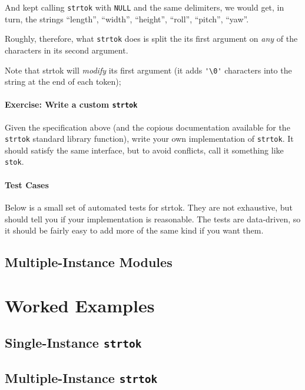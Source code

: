 \documentclass[a4paper,10pt]{article}
\newcommand{\kw}[1]{\texttt{#1}}
\newcommand{\filename}[1]{\texttt{#1}}
\newcommand{\drmcode}[3]{\noindent\begin{minipage}{\columnwidth}\end{minipage}}
\newcommand{\cfile}[1]{\drmcode{C}{\filename{#1}}{#1}}
\begin{document}
\noindent
And kept calling \kw{strtok} with \kw{NULL} and the same delimiters,
we would get, in turn, the strings ``length'', ``width'', ``height'',
``roll'', ``pitch'', ``yaw''.

Roughly, therefore, what \kw{strtok} does is split the its first
argument on \emph{any} of the characters in its second argument.

Note that strtok will \emph{modify} its first argument (it adds
\verb!'\0'! characters into the string at the end of each token);

\paragraph{Exercise: Write a custom \kw{strtok}}
Given the specification above (and the copious documentation available
for the \kw{strtok} standard library function), write your own
implementation of \kw{strtok}. It should satisfy the same interface,
but to avoid conflicts, call it something like \kw{stok}.

\paragraph{Test Cases}
Below is a small set of automated tests for strtok. They are not
exhaustive, but should tell you if your implementation is
reasonable. The tests are data-driven, so it should be fairly easy to
add more of the same kind if you want them.



\subsection{Multiple-Instance Modules}

\section{Worked Examples}

\subsection{Single-Instance \kw{strtok}}

\cfile{stok.h}

\cfile{stok.h}

\subsection{Multiple-Instance \kw{strtok}}

\cfile{tok.h}

\cfile{tok.c}
\end{document}
